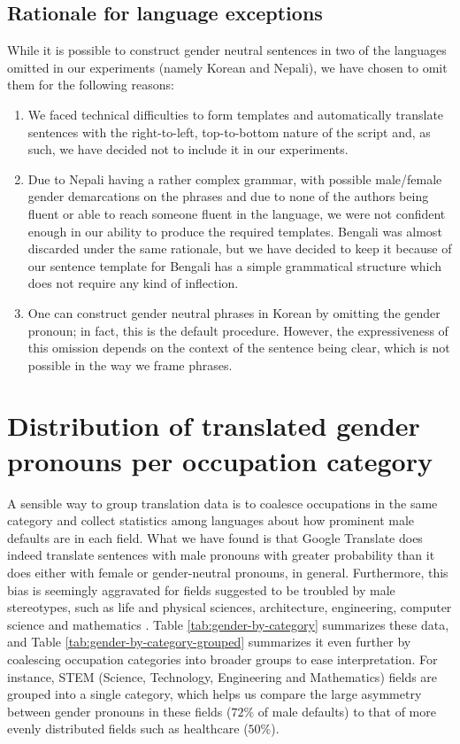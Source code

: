 \documentclass[twoside,11pt]{article}
\begin{document}
\subsection{Rationale for language exceptions}
\label{ssec:rationale_for_language_exceptions}

While it is possible to construct gender neutral sentences in two of the languages omitted in our experiments (namely Korean and Nepali), we have chosen to omit them for the following reasons:

\begin{enumerate}
\item We faced technical difficulties to form templates and automatically translate sentences with the right-to-left, top-to-bottom nature of the script and, as such, we have decided not to include it in our experiments.
\item Due to Nepali having a rather complex grammar, with possible male/female gender demarcations on the phrases and due to none of the authors being fluent or able to reach someone fluent in the language, we were not confident enough in our ability to produce the required templates. Bengali was almost discarded under the same rationale, but we have decided to keep it because of our sentence template for Bengali has a simple grammatical structure which does not require any kind of inflection.
\item One can construct gender neutral phrases in Korean by omitting the gender pronoun; in fact, this is the default procedure. However, the expressiveness of this omission depends on the context of the sentence being clear, which is not possible in the way we frame phrases.
\end{enumerate}

\section{Distribution of translated gender pronouns per occupation category}

A sensible way to group translation data is to coalesce occupations in the same category and collect statistics among languages about how prominent male defaults are in each field. What we have found is that Google Translate does indeed translate sentences with male pronouns with greater probability than it does either with female or gender-neutral pronouns, in general. Furthermore, this bias is seemingly aggravated for fields suggested to be troubled by male stereotypes, such as life and physical sciences, architecture, engineering, computer science and mathematics \cite{moss2015can}. Table \ref{tab:gender-by-category} summarizes these data, and Table \ref{tab:gender-by-category-grouped} summarizes it even further by coalescing occupation categories into broader groups to ease interpretation. For instance, STEM (Science, Technology, Engineering and Mathematics) fields are grouped into a single category, which helps us compare the large asymmetry between gender pronouns in these fields ($72\%$ of male defaults) to that of more evenly distributed fields such as healthcare ($50\%$).
\end{document}
